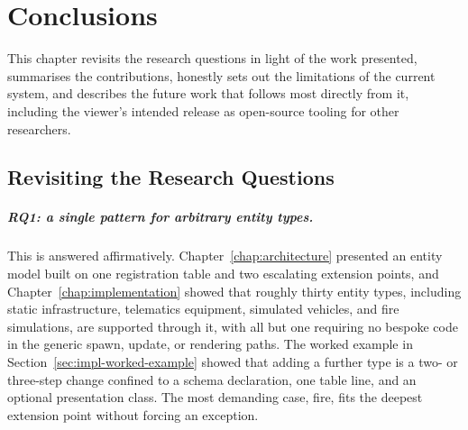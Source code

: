 \chapter{Conclusions}
\label{chap:conclusions}

\begin{introduction}
This chapter revisits the research questions in light of the work presented, summarises the contributions, honestly sets out the limitations of the current system, and describes the future work that follows most directly from it, including the viewer's intended release as open-source tooling for other researchers.
\end{introduction}

\section{Revisiting the Research Questions}
\label{sec:conc-rqs}

\paragraph{RQ1: a single pattern for arbitrary entity types.} This is answered affirmatively. Chapter~\ref{chap:architecture} presented an entity model built on one registration table and two escalating extension points, and Chapter~\ref{chap:implementation} showed that roughly thirty entity types, including static infrastructure, telematics equipment, simulated vehicles, and fire simulations, are supported through it, with all but one requiring no bespoke code in the generic spawn, update, or rendering paths. The worked example in Section~\ref{sec:impl-worked-example} showed that adding a further type is a two- or three-step change confined to a schema declaration, one table line, and an optional presentation class. The most demanding case, fire, fits the deepest extension point without forcing an exception.

